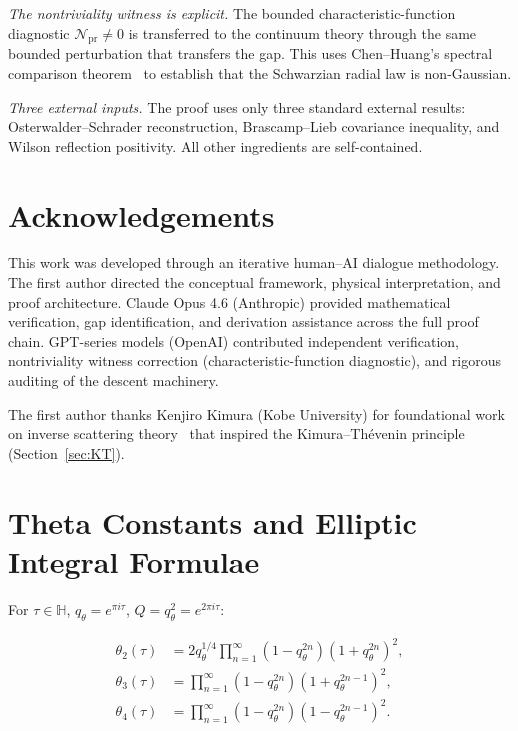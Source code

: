\documentclass[12pt]{article}
\theoremstyle{plain}
\theoremstyle{definition}
\numberwithin{equation}{section}
\newcommand{\HH}{\mathbb{H}}
\newcommand{\pr}{\mathrm{pr}}
\begin{document}
\emph{The nontriviality witness is explicit.}  The bounded characteristic-function diagnostic $\mathcal{N}_{\pr}\neq 0$ is transferred to the continuum theory through the same bounded perturbation that transfers the gap.  This uses Chen--Huang's spectral comparison theorem~\cite{ChenHuang2012} to establish that the Schwarzian radial law is non-Gaussian.

\emph{Three external inputs.}  The proof uses only three standard external results: Osterwalder--Schrader reconstruction, Brascamp--Lieb covariance inequality, and Wilson reflection positivity.  All other ingredients are self-contained.



\section*{Acknowledgements}

This work was developed through an iterative human--AI dialogue methodology.
The first author directed the conceptual framework, physical interpretation,
and proof architecture.
Claude Opus 4.6 (Anthropic) provided mathematical verification,
gap identification, and derivation assistance across the full proof chain.
GPT-series models (OpenAI) contributed independent verification,
nontriviality witness correction (characteristic-function diagnostic),
and rigorous auditing of the descent machinery.

The first author thanks Kenjiro Kimura (Kobe University) for foundational
work on inverse scattering theory~\cite{Kimura2020,Kimura2021,Kimura2022}
that inspired the Kimura--Th\'evenin principle (Section~\ref{sec:KT}).



\appendix

\section{Theta Constants and Elliptic Integral Formulae}\label{app:theta}

For $\tau\in\HH$, $q_\theta=e^{\pi i\tau}$, $Q=q_\theta^2=e^{2\pi i\tau}$:

\begin{align}
\theta_2(\tau) &= 2q_\theta^{1/4}\prod_{n=1}^\infty(1-q_\theta^{2n})(1+q_\theta^{2n})^2,\\
\theta_3(\tau) &= \prod_{n=1}^\infty(1-q_\theta^{2n})(1+q_\theta^{2n-1})^2,\\
\theta_4(\tau) &= \prod_{n=1}^\infty(1-q_\theta^{2n})(1-q_\theta^{2n-1})^2.
\end{align}
\end{document}
